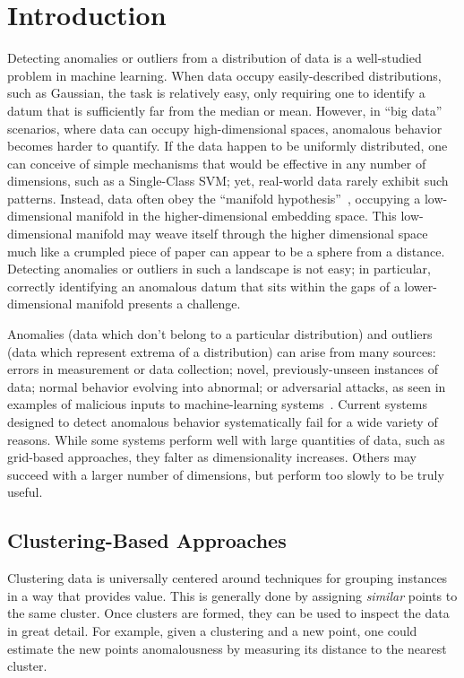 \section{Introduction}
\label{sec:introduction}

Detecting anomalies or outliers from a distribution of data is a well-studied problem in machine learning.
When data occupy easily-described distributions, such as Gaussian, the task is relatively easy, only requiring one to identify a datum that is sufficiently far from the median or mean.
However, in ``big data'' scenarios, where data can occupy high-dimensional spaces, anomalous behavior becomes harder to quantify.
If the data happen to be uniformly distributed, one can conceive of simple mechanisms that would be effective in any number of dimensions, such as a Single-Class SVM; yet, real-world data rarely exhibit such patterns.
Instead, data often obey the ``manifold hypothesis''~\cite{fefferman2016testing}, occupying a low-dimensional manifold in the higher-dimensional embedding space.
This low-dimensional manifold may weave itself through the higher dimensional space much like a crumpled piece of paper can appear to be a sphere from a distance.
Detecting anomalies or outliers in such a landscape is not easy; in particular, correctly identifying an anomalous datum that sits within the gaps of a lower-dimensional manifold presents a challenge.

Anomalies (data which don't belong to a particular distribution) and outliers (data which represent extrema of a distribution) can arise from many sources: errors in measurement or data collection; novel, previously-unseen instances of data; normal behavior evolving into abnormal; or adversarial attacks, as seen in examples of malicious inputs to machine-learning systems~\cite{elsayed2018adversarial}.
Current systems designed to detect anomalous behavior systematically fail for a wide variety of reasons.
While some systems perform well with large quantities of data, such as grid-based approaches, they falter as dimensionality increases.
Others may succeed with a larger number of dimensions, but perform too slowly to be truly useful.

\subsection{Clustering-Based Approaches}

Clustering data is universally centered around techniques for grouping instances in a way that provides value.
This is generally done by assigning \textit{similar} points to the same cluster.
Once clusters are formed, they can be used to inspect the data in great detail.
For example, given a clustering and a new point, one could estimate the new points anomalousness by measuring its distance to the nearest cluster.

